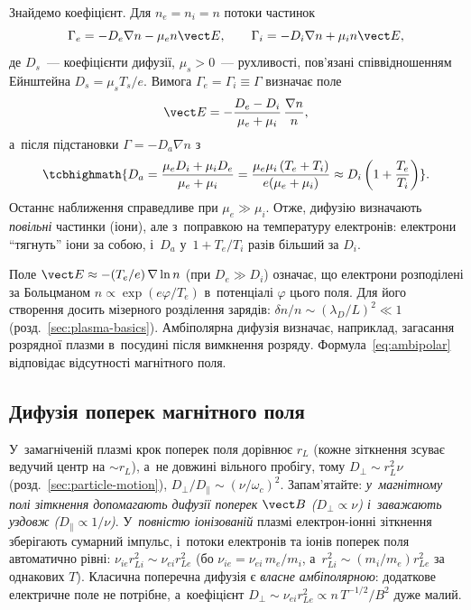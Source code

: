 Знайдемо коефіцієнт. Для $n_e=n_i=n$ потоки частинок
\begin{equation*}
	\Gamma_e=-D_e\nabla n-\mu_en\vect E,\qquad
	\Gamma_i=-D_i\nabla n+\mu_in\vect E,
\end{equation*}
де $D_s$~--- коефіцієнти дифузії, $\mu_s>0$~--- рухливості, пов'язані співвідношенням
Ейнштейна $D_s=\mu_sT_s/e$. Вимога $\Gamma_e=\Gamma_i\equiv\Gamma$ визначає
поле
\begin{equation*}
	\vect E=-\frac{D_e-D_i}{\mu_e+\mu_i}\,\frac{\nabla n}n,
\end{equation*}
а~після підстановки $\Gamma=-D_a\nabla n$ з~
\begin{equation}\label{eq:ambipolar}
	\tcbhighmath{D_a=\frac{\mu_eD_i+\mu_iD_e}{\mu_e+\mu_i}=\frac{\mu_e\mu_i\,(T_e+T_i)}{e(\mu_e+\mu_i)}\approx D_i\left(1+\frac{T_e}{T_i}\right)}.
\end{equation}
Останнє наближення справедливе при $\mu_e\gg\mu_i$. Отже, дифузію визначають
\emph{повільні} частинки (іони), але з~поправкою на температуру електронів: електрони
\enquote{тягнуть} іони за собою, і~$D_a$ у~$1+T_e/T_i$ разів більший за $D_i$.

Поле $\vect E\approx-(T_e/e)\,\nabla\ln n$ (при $D_e\gg D_i$) означає, що
електрони розподілені за Больцманом $n\propto\exp(e\varphi/T_e)$ в~потенціалі
$\varphi$ цього поля. Для його створення досить мізерного розділення зарядів: $\delta
n/n\sim(\lambda_D/L)^2\ll1$ (розд.~\ref{sec:plasma-basics}). Амбіполярна дифузія визначає,
наприклад, загасання розрядної плазми в~посудині після вимкнення розряду.
Формула~\eqref{eq:ambipolar} відповідає відсутності магнітного поля.

\subsection*{Дифузія поперек магнітного поля}
У~замагніченій плазмі крок поперек поля дорівнює $r_L$ (кожне зіткнення зсуває ведучий центр на $\sim r_L$), а~не довжині вільного пробігу, тому
$D_\perp\sim r_L^2\nu$ (розд.~\ref{sec:particle-motion}), $D_\perp/D_\parallel\sim(\nu/\omega_c)^2$.
Запам'ятайте: \emph{у~магнітному полі зіткнення допомагають дифузії поперек $\vect B$ ($D_\perp\propto\nu$) і~заважають уздовж ($D_\parallel\propto1/\nu$)}.
У~\emph{повністю іонізованій} плазмі електрон-іонні зіткнення зберігають сумарний імпульс, і~потоки
електронів та іонів поперек поля автоматично рівні: $\nu_{ie}r_{Li}^2\sim\nu_{ei}r_{Le}^2$
(бо $\nu_{ie}=\nu_{ei}\,m_e/m_i$, а~$r_{Li}^2\sim(m_i/m_e)r_{Le}^2$ за однакових $T$). Класична поперечна дифузія є
\emph{власне амбіполярною}: додаткове електричне поле не потрібне, а~коефіцієнт
$D_\perp\sim\nu_{ei}r_{Le}^2\propto n\,T^{-1/2}/B^2$ дуже малий.

